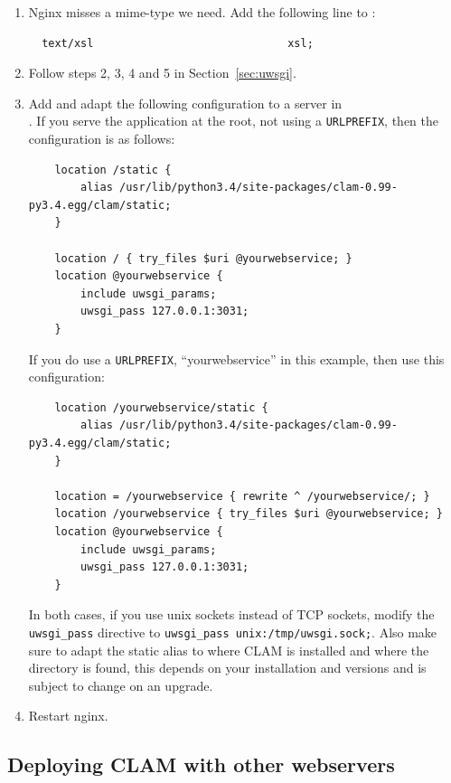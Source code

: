 \documentclass[a4paper,12pt,twoside,openright]{report}
\begin{document}
\begin{enumerate}[leftmargin=5mm]
\item Nginx misses a mime-type we need. Add the following
    line to :
{ \small
\begin{verbatim}
  text/xsl                              xsl;
\end{verbatim}
}

\item Follow steps 2, 3, 4 and 5 in Section~\ref{sec:uwsgi}.

\item Add and adapt the following configuration to a server in \\
    . If you serve the application at the
        root, not using a \texttt{URLPREFIX}, then the configuration is as
        follows:
{\small
\begin{verbatim}
    location /static {
        alias /usr/lib/python3.4/site-packages/clam-0.99-py3.4.egg/clam/static;
    }

    location / { try_files $uri @yourwebservice; }
    location @yourwebservice {
        include uwsgi_params;
        uwsgi_pass 127.0.0.1:3031;
    }
\end{verbatim}
}
If you do use a \texttt{URLPREFIX}, ``yourwebservice'' in this example, then
use this configuration:
{\small
\begin{verbatim}
    location /yourwebservice/static {
        alias /usr/lib/python3.4/site-packages/clam-0.99-py3.4.egg/clam/static;
    }

    location = /yourwebservice { rewrite ^ /yourwebservice/; }
    location /yourwebservice { try_files $uri @yourwebservice; }
    location @yourwebservice {
        include uwsgi_params;
        uwsgi_pass 127.0.0.1:3031;
    }
\end{verbatim}
}
In both cases, if you use unix sockets instead of TCP sockets, modify the \texttt{uwsgi\_pass} directive
to \texttt{uwsgi\_pass unix:/tmp/uwsgi.sock;}. Also make sure to adapt the static alias to where CLAM is
installed and where the  directory is found, this depends on your
installation and versions and is subject to change on an upgrade.
\item Restart nginx.
\end{enumerate}

\subsection{Deploying CLAM with other webservers}
\end{document}
